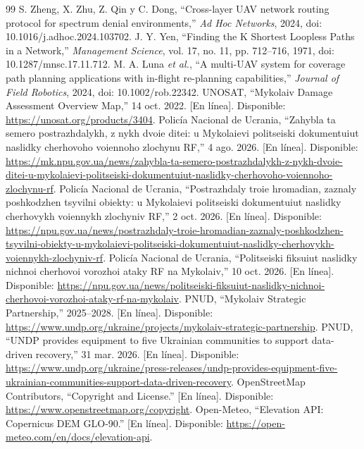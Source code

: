 \documentclass[journal,10pt]{IEEEtran}
\begin{document}
\begin{thebibliography}{99}
 S. Zheng, X. Zhu, Z. Qin y C. Dong, ``Cross-layer UAV network routing protocol for spectrum denial environments,'' \emph{Ad Hoc Networks}, 2024, doi: 10.1016/j.adhoc.2024.103702.
 J. Y. Yen, ``Finding the K Shortest Loopless Paths in a Network,'' \emph{Management Science}, vol. 17, no. 11, pp. 712--716, 1971, doi: 10.1287/mnsc.17.11.712.
 M. A. Luna \emph{et al.}, ``A multi-UAV system for coverage path planning applications with in-flight re-planning capabilities,'' \emph{Journal of Field Robotics}, 2024, doi: 10.1002/rob.22342.
 UNOSAT, ``Mykolaiv Damage Assessment Overview Map,'' 14 oct. 2022. [En línea]. Disponible: \url{https://unosat.org/products/3404}.
 Policía Nacional de Ucrania, ``Zahybla ta semero postrazhdalykh, z nykh dvoie ditei: u Mykolaievi politseiski dokumentuiut naslidky cherhovoho voiennoho zlochynu RF,'' 4 ago. 2026. [En línea]. Disponible: \url{https://mk.npu.gov.ua/news/zahybla-ta-semero-postrazhdalykh-z-nykh-dvoie-ditei-u-mykolaievi-politseiski-dokumentuiut-naslidky-cherhovoho-voiennoho-zlochynu-rf}.
 Policía Nacional de Ucrania, ``Postrazhdaly troie hromadian, zaznaly poshkodzhen tsyvilni obiekty: u Mykolaievi politseiski dokumentuiut naslidky cherhovykh voiennykh zlochyniv RF,'' 2 oct. 2026. [En línea]. Disponible: \url{https://npu.gov.ua/news/postrazhdaly-troie-hromadian-zaznaly-poshkodzhen-tsyvilni-obiekty-u-mykolaievi-politseiski-dokumentuiut-naslidky-cherhovykh-voiennykh-zlochyniv-rf}.
 Policía Nacional de Ucrania, ``Politseiski fiksuiut naslidky nichnoi cherhovoi vorozhoi ataky RF na Mykolaiv,'' 10 oct. 2026. [En línea]. Disponible: \url{https://npu.gov.ua/news/politseiski-fiksuiut-naslidky-nichnoi-cherhovoi-vorozhoi-ataky-rf-na-mykolaiv}.
 PNUD, ``Mykolaiv Strategic Partnership,'' 2025--2028. [En línea]. Disponible: \url{https://www.undp.org/ukraine/projects/mykolaiv-strategic-partnership}.
 PNUD, ``UNDP provides equipment to five Ukrainian communities to support data-driven recovery,'' 31 mar. 2026. [En línea]. Disponible: \url{https://www.undp.org/ukraine/press-releases/undp-provides-equipment-five-ukrainian-communities-support-data-driven-recovery}.
 OpenStreetMap Contributors, ``Copyright and License.'' [En línea]. Disponible: \url{https://www.openstreetmap.org/copyright}.
 Open-Meteo, ``Elevation API: Copernicus DEM GLO-90.'' [En línea]. Disponible: \url{https://open-meteo.com/en/docs/elevation-api}.

\end{thebibliography}
\end{document}
